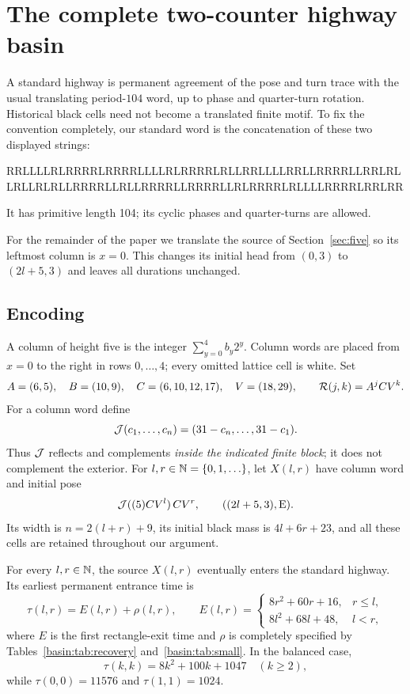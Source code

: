 \section{The complete two-counter highway basin}\label{sec:basin}
A standard highway is permanent
agreement of the pose and turn trace with the usual translating period-$104$
word, up to phase and quarter-turn rotation. Historical black cells need not
become a translated finite motif. To fix the convention completely, our standard
word is the concatenation of these two displayed strings:
\begin{center}\scriptsize\ttfamily
RRLLLLRLRRRRLRRRRLLLLRLRRRRLRLLRRLLLLRRLLRRRRLLRRLRL\\
LRLLRLRLLRRRRLLRLLRRRRLLRRRRLLRLRRRRLRLLLLRRRRLRRLRR
\end{center}
It has primitive length 104; its cyclic phases and quarter-turns are allowed.

For the remainder of the paper we translate the source of
Section~\ref{sec:five} so its leftmost column is $x=0$. This changes its
initial head from $(0,3)$ to $(2l+5,3)$ and leaves all durations unchanged.
\subsection{Encoding}
A column of height five is the integer $\sum_{y=0}^4b_y2^y$. Column words are
placed from $x=0$ to the right in rows $0,\ldots,4$; every omitted lattice cell
is white. Set
\[
 A=(6,5),\quad B=(10,9),\quad C=(6,10,12,17),\quad V=(18,29),
 \qquad \mathcal R(j,k)=A^jCV^k.
\]
For a column word define
\[
 \mathcal J(c_1,\ldots,c_n)=(31-c_n,\ldots,31-c_1).
\]
Thus $\mathcal J$ reflects and complements \emph{inside the indicated finite block};
it does not complement the exterior. For $l,r\in\mathbb N=\{0,1,\ldots\}$, let
$X(l,r)$ have column word and initial pose
\begin{equation}
 \mathcal J((5)CV^l)\,CV^r,\qquad ((2l+5,3),\mathrm E).                 \label{basin:eq:source}
\end{equation}
Its width is $n=2(l+r)+9$, its initial black mass is $4l+6r+23$, and all these
cells are retained throughout our argument.

\begin{theorem}\label{basin:thm:main}
For every $l,r\in\mathbb N$, the source $X(l,r)$ eventually enters the standard
highway. Its earliest permanent entrance time is
\[
 \tau(l,r)=E(l,r)+\rho(l,r),\qquad
 E(l,r)=\begin{cases}8r^2+60r+16,&r\le l,\\8l^2+68l+48,&l<r,\end{cases}
\]
where $E$ is the first rectangle-exit time and $\rho$ is completely specified
by Tables~\ref{basin:tab:recovery} and~\ref{basin:tab:small}. In the balanced case,
\begin{equation}
 \tau(k,k)=8k^2+100k+1047\quad(k\ge2),                    \label{basin:eq:balanced}
\end{equation}
while $\tau(0,0)=11576$ and $\tau(1,1)=1024$.
\end{theorem}

